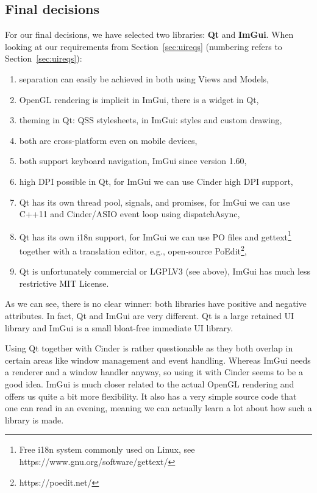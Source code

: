 \subsection{Final decisions}

For our final decisions, we have selected two libraries: \textbf{Qt} and \textbf{ImGui}.
When looking at our requirements from Section~\ref{sec:uireqs} (numbering refers to Section~\ref{sec:uireqs}):
%
\begin{enumerate}
\setlength\itemsep{0em}
\item separation can easily be achieved in both using Views and Models,
\item OpenGL rendering is implicit in ImGui, there is a widget in Qt,
\item theming in Qt: QSS stylesheets, in ImGui: styles and custom drawing,
\item both are cross-platform even on mobile devices,
\item both support keyboard navigation, ImGui since version 1.60,
\item high DPI possible in Qt, for ImGui we can use Cinder high DPI support,
\item Qt has its own thread pool, signals, and promises, for ImGui we can use C++11 and Cinder/ASIO event loop using dispatchAsync,
\item Qt has its own i18n support, for ImGui we can use PO files and gettext\footnote{Free i18n system commonly used on Linux, see https://www.gnu.org/software/gettext/} together with a translation editor, e.g., open-source PoEdit\footnote{https://poedit.net/},
\item Qt is unfortunately commercial or LGPLV3 (see above), ImGui has much less restrictive MIT License.
\end{enumerate}

As we can see, there is no clear winner: both libraries have positive and negative attributes.
In fact, Qt and ImGui are very different.
Qt is a large retained UI library and ImGui is a small bloat-free immediate UI library.

Using Qt together with Cinder is rather questionable as they both overlap in certain areas like window management and event handling.
Whereas ImGui needs a renderer and a window handler anyway, so using it with Cinder seems to be a good idea.
ImGui is much closer related to the actual OpenGL rendering and offers us quite a bit more flexibility.
It also has a very simple source code that one can read in an evening, meaning we can actually learn a lot about how such a library is made.

